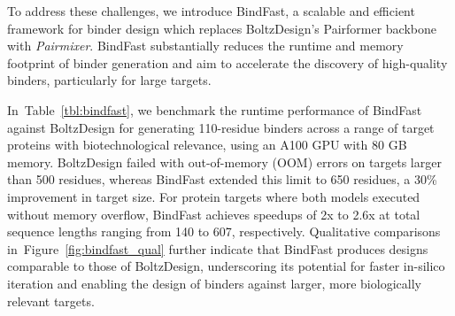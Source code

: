 \documentclass{article} %
\newcommand{\reffig}[1]{Figure~\ref{fig:#1}}
\newcommand{\reftbl}[1]{Table~\ref{tbl:#1}}
\def\name{{\textit{Pairmixer}}\xspace}
\begin{document}
To address these challenges, we introduce BindFast, a scalable and efficient framework for binder design which replaces BoltzDesign’s Pairformer backbone with \name.
BindFast substantially reduces the runtime and memory footprint of binder generation and aim to accelerate the discovery of high-quality binders, particularly for large targets.



In~\reftbl{bindfast}, we benchmark the runtime performance of BindFast against BoltzDesign for generating 110-residue binders across a range of target proteins with biotechnological relevance, using an A100 GPU with 80 GB memory. 
BoltzDesign failed with out-of-memory (OOM) errors on targets larger than 500 residues, whereas BindFast extended this limit to 650 residues, a 30\% improvement in target size. 
For protein targets where both models executed without memory overflow, BindFast achieves speedups of 2x to 2.6x at total sequence lengths ranging from 140 to 607, respectively. 
Qualitative comparisons in~\reffig{bindfast_qual} further indicate that BindFast produces designs comparable to those of BoltzDesign, underscoring its potential for faster in-silico iteration and enabling the design of binders against larger, more biologically relevant targets.
\end{document}
